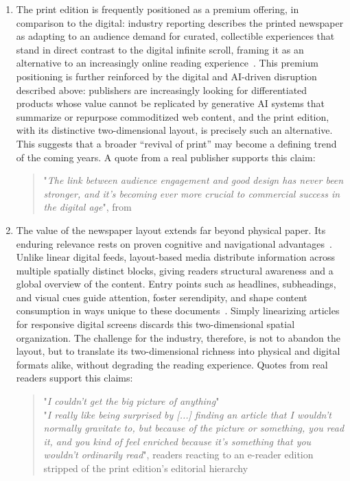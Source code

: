 \begin{enumerate}
    
    \item The print edition is frequently positioned as a premium offering, in comparison to the digital: industry reporting describes the printed newspaper as adapting to an audience demand for curated, collectible experiences that stand in direct contrast to the digital infinite scroll, framing it as an alternative to an increasingly online reading experience~\cite{radcliffe-wan-ifra-2025-2026}. This premium positioning is further reinforced by the digital and AI-driven disruption described above: publishers are increasingly looking for differentiated products whose value cannot be replicated by generative AI systems that summarize or repurpose commoditized web content, and the print edition, with its distinctive two-dimensional layout, is precisely such an alternative. This suggests that a broader ``revival of print'' may become a defining trend of the coming years. A quote from a real publisher supports this claim:

    \begin{quote}
    "{\itshape The link between audience engagement and good design has never been stronger, and it's becoming ever more crucial to commercial success in the digital age}",
    from~\cite{Mor16}
       \label{quote:design-engagement}
    \end{quote}

    \item The value of the newspaper layout extends far beyond physical paper. Its enduring relevance rests on proven cognitive and navigational advantages~\cite{ozretic_dosen_key_2018, hollander_e-reader_2011, holsanova_entry_2006}. Unlike linear digital feeds, layout-based media distribute information across multiple spatially distinct blocks, giving readers structural awareness and a global overview of the content. Entry points such as headlines, subheadings, and visual cues guide attention, foster serendipity, and shape content consumption in ways unique to these documents~. Simply linearizing articles for responsive digital screens discards this two-dimensional spatial organization. The challenge for the industry, therefore, is not to abandon the layout, but to translate its two-dimensional richness into physical and digital formats alike, without degrading the reading experience. Quotes from real readers support this claims:
    
    \begin{quote}
    "{\itshape I couldn't get the big picture of anything}" \\
    "{\itshape I really like being surprised by [...] finding an article that I wouldn't normally gravitate to, but because of the picture or something, you read it, and you kind of feel enriched because it's something that you wouldn't ordinarily read}",
    readers reacting to an e-reader edition stripped of the print edition's editorial hierarchy~\cite{hollander_e-reader_2011}
    \label{quote:global-awareness}
    \end{quote}

   
 
\end{enumerate}
